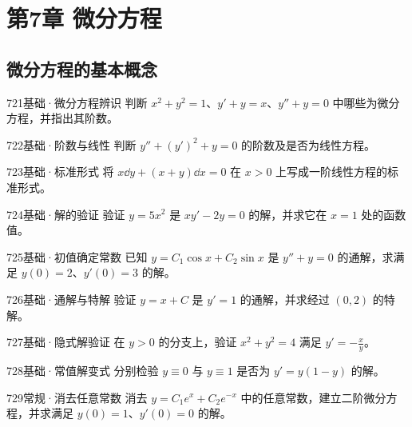 \section{第7章 微分方程}
\subsection{微分方程的基本概念}
\begin{exercise}{721}{基础·微分方程辨识}
判断 $x^2+y^2=1$、$y'+y=x$、$y''+y=0$ 中哪些为微分方程，并指出其阶数。
\end{exercise}
\begin{exercise}{722}{基础·阶数与线性}
判断 $y''+(y')^2+y=0$ 的阶数及是否为线性方程。
\end{exercise}
\begin{exercise}{723}{基础·标准形式}
将 $x\dd y+(x+y)\dd x=0$ 在 $x>0$ 上写成一阶线性方程的标准形式。
\end{exercise}
\begin{exercise}{724}{基础·解的验证}
验证 $y=5x^2$ 是 $xy'-2y=0$ 的解，并求它在 $x=1$ 处的函数值。
\end{exercise}
\begin{exercise}{725}{基础·初值确定常数}
已知 $y=C_1\cos x+C_2\sin x$ 是 $y''+y=0$ 的通解，求满足 $y(0)=2$、$y'(0)=3$ 的解。
\end{exercise}
\begin{exercise}{726}{基础·通解与特解}
验证 $y=x+C$ 是 $y'=1$ 的通解，并求经过 $(0,2)$ 的特解。
\end{exercise}
\begin{exercise}{727}{基础·隐式解验证}
在 $y>0$ 的分支上，验证 $x^2+y^2=4$ 满足 $y'=-\frac{x}{y}$。
\end{exercise}
\begin{exercise}{728}{基础·常值解变式}
分别检验 $y\equiv0$ 与 $y\equiv1$ 是否为 $y'=y(1-y)$ 的解。
\end{exercise}
\begin{exercise}{729}{常规·消去任意常数}
消去 $y=C_1e^x+C_2e^{-x}$ 中的任意常数，建立二阶微分方程，并求满足 $y(0)=1$、$y'(0)=0$ 的解。
\end{exercise}
